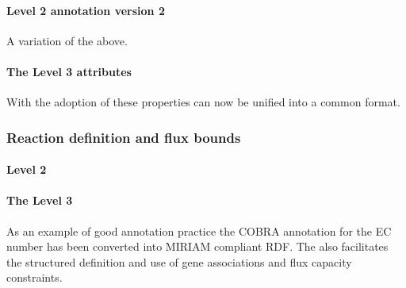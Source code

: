 \begin{newsection}
\paragraph{\SBML Level 2 \Species annotation version 2}
A variation of the above.
%

\paragraph{The \SBML Level 3 \FBC \Species attributes}
With the adoption of \SBML \FBC these \Species properties can now be unified into a common format.
%

\subsubsection*{Reaction definition and flux bounds}
\paragraph{\SBML Level 2 \Reaction}
%

\paragraph{The \SBML Level 3 \FBC \Reaction}

As an example of good annotation practice the COBRA \Notes annotation for the \textsf{EC number} has been converted into MIRIAM compliant RDF. The \FBCPackage also facilitates the structured definition and use of gene associations and flux capacity constraints.

%

\end{newsection}
